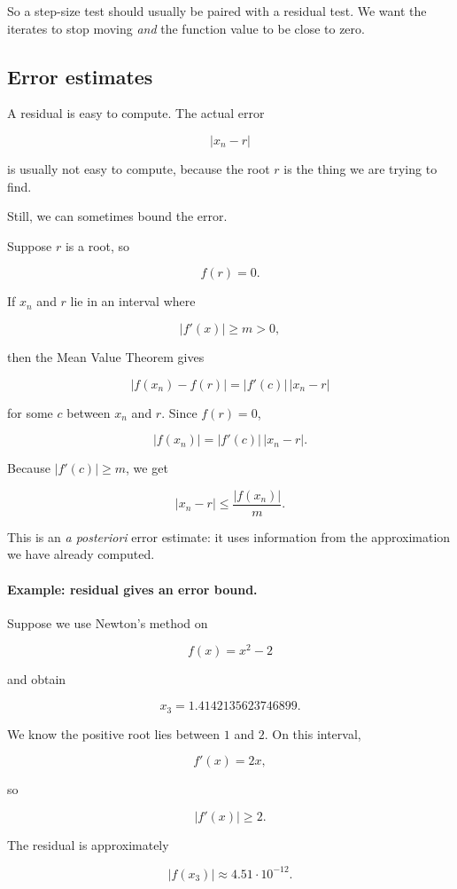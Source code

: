 So a step-size test should usually be paired with a residual test.  We want the iterates to
stop moving \emph{and} the function value to be close to zero.

\subsection{Error estimates}
\label{subsec:newton-error-estimates}

A residual is easy to compute.  The actual error

\[
|x_n-r|
\]

is usually not easy to compute, because the root \(r\) is the thing we are trying to find.

Still, we can sometimes bound the error.

Suppose \(r\) is a root, so

\[
f(r)=0.
\]

If \(x_n\) and \(r\) lie in an interval where

\[
|f'(x)|\ge m>0,
\]

then the Mean Value Theorem gives

\[
|f(x_n)-f(r)|=|f'(c)|\,|x_n-r|
\]

for some \(c\) between \(x_n\) and \(r\).  Since \(f(r)=0\),

\[
|f(x_n)|=|f'(c)|\,|x_n-r|.
\]

Because \(|f'(c)|\ge m\), we get

\[
\boxed{
|x_n-r|\le \frac{|f(x_n)|}{m}.
}
\]

This is an \emph{a posteriori} error estimate: it uses information from the approximation
we have already computed.

\paragraph{Example: residual gives an error bound.}
Suppose we use Newton's method on

\[
f(x)=x^2-2
\]

and obtain

\[
x_3=1.4142135623746899.
\]

We know the positive root lies between \(1\) and \(2\).  On this interval,

\[
f'(x)=2x,
\]

so

\[
|f'(x)|\ge 2.
\]

The residual is approximately

\[
|f(x_3)|\approx 4.51\cdot10^{-12}.
\]

